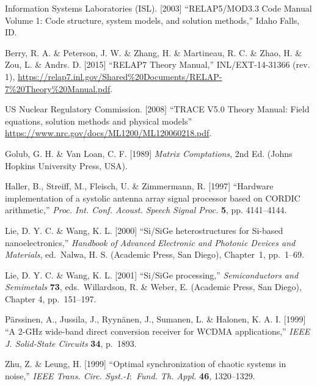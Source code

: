 \documentclass{ws-ijbc}
\begin{document}
\begin{thebibliography}{9}
 Information Systems Laboratories (ISL). [2003] ``{RELAP5/MOD3.3} Code Manual Volume 1: Code structure, system models, and solution methods,'' Idaho Falls, ID. 

 Berry, R. A. \& Peterson, J. W. \& Zhang, H. \& Martineau, R. C. \& Zhao, H. \& Zou, L. \& Andrs. D. [2015] ``{RELAP7} Theory Manual,'' INL/EXT-14-31366 (rev. 1),  \url{https://relap7.inl.gov/Shared%20Documents/RELAP-7%20Theory%20Manual.pdf}.

 US Nuclear Regulatory Commission. [2008] ``{TRACE V5.0} Theory Manual: Field equations, solution methods and physical models'' \url{https://www.nrc.gov/docs/ML1200/ML120060218.pdf}.





 Golub, G. H. \& Van Loan, C. F. [1989] {\it Matrix
Comptations}, 2nd Ed. (Johns Hopkins University Press, USA).

 Haller, B., Streiff, M., Fleisch, U. \& Zimmermann,
R. [1997] ``Hardware implementation of a systolic \hbox{antenna}
array signal processor based on CORDIC arithmetic,'' {\it Proc.
Int. Conf. Acoust. Speech \hbox{Signal} Proc.} {\bf 5},
pp. 4141--4144.

 Lie, D. Y. C. \& Wang, K. L. [2000]  ``Si/SiGe
heterostructures for Si-based nanoelectronics,'' {\it Handbook of}
\hbox{\it Advanced} {\it Electronic and Photonic Devices and
Materials}, ed.~Nalwa, H. S. (\hbox{Academic}
Press, San Diego), Chapter~1, pp.~1--69.

 Lie, D. Y. C. \& Wang, K. L. [2001]
``Si/SiGe processing,''
{\it Semiconductors and Semimetals} {\bf 73}, eds.~Willardson, R.
\& Weber, E. (Academic Press, San Diego), Chapter 4, pp.~151--197.

 P\"arssinen, A., Jussila, J., Ryyn\"anen, J.,
Sumanen, L. \& Halonen, K.  A. I. [1999] ``A 2-GHz wide-band direct conversion receiver for WCDMA applications,'' {\it IEEE J. Solid-State
Circuits} {\bf 34}, p.~1893.

Zhu, Z. \& Leung, H. [1999] ``Optimal synchronization of chaotic systems in
noise,'' {\it IEEE Trans. Circ. Syst.-I\/$:$ Fund. Th. Appl.} {\bf 46},
1320--1329.

\end{thebibliography}


\end{document}
